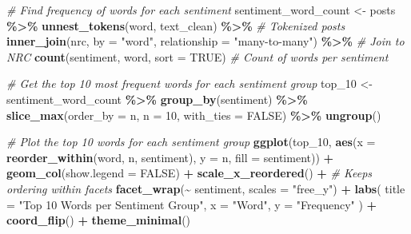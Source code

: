 \documentclass[
]{article}
\newenvironment{Shaded}{\begin{snugshade}}{\end{snugshade}}
\newcommand{\AttributeTok}[1]{\textcolor[rgb]{0.13,0.29,0.53}{#1}}
\newcommand{\CommentTok}[1]{\textcolor[rgb]{0.56,0.35,0.01}{\textit{#1}}}
\newcommand{\ConstantTok}[1]{\textcolor[rgb]{0.56,0.35,0.01}{#1}}
\newcommand{\DecValTok}[1]{\textcolor[rgb]{0.00,0.00,0.81}{#1}}
\newcommand{\FunctionTok}[1]{\textcolor[rgb]{0.13,0.29,0.53}{\textbf{#1}}}
\newcommand{\NormalTok}[1]{#1}
\newcommand{\OtherTok}[1]{\textcolor[rgb]{0.56,0.35,0.01}{#1}}
\newcommand{\SpecialCharTok}[1]{\textcolor[rgb]{0.81,0.36,0.00}{\textbf{#1}}}
\newcommand{\StringTok}[1]{\textcolor[rgb]{0.31,0.60,0.02}{#1}}
\begin{document}
\begin{Shaded}
\begin{Highlighting}[]
\CommentTok{\# Find frequency of words for each sentiment }
\NormalTok{sentiment\_word\_count }\OtherTok{\textless{}{-}}\NormalTok{ posts }\SpecialCharTok{\%\textgreater{}\%} 
  \FunctionTok{unnest\_tokens}\NormalTok{(word, text\_clean) }\SpecialCharTok{\%\textgreater{}\%} \CommentTok{\# Tokenized posts}
  \FunctionTok{inner\_join}\NormalTok{(nrc, }\AttributeTok{by =} \StringTok{"word"}\NormalTok{, }\AttributeTok{relationship =} \StringTok{"many{-}to{-}many"}\NormalTok{) }\SpecialCharTok{\%\textgreater{}\%} \CommentTok{\# Join to NRC }
  \FunctionTok{count}\NormalTok{(sentiment, word, }\AttributeTok{sort =} \ConstantTok{TRUE}\NormalTok{)  }\CommentTok{\# Count of words per sentiment }

\CommentTok{\# Get the top 10 most frequent words for each sentiment group }
\NormalTok{top\_10 }\OtherTok{\textless{}{-}}\NormalTok{ sentiment\_word\_count }\SpecialCharTok{\%\textgreater{}\%} 
  \FunctionTok{group\_by}\NormalTok{(sentiment) }\SpecialCharTok{\%\textgreater{}\%} 
  \FunctionTok{slice\_max}\NormalTok{(}\AttributeTok{order\_by =}\NormalTok{ n, }\AttributeTok{n =} \DecValTok{10}\NormalTok{, }\AttributeTok{with\_ties =} \ConstantTok{FALSE}\NormalTok{) }\SpecialCharTok{\%\textgreater{}\%}
  \FunctionTok{ungroup}\NormalTok{()}

\CommentTok{\# Plot the top 10 words for each sentiment group }
\FunctionTok{ggplot}\NormalTok{(top\_10, }\FunctionTok{aes}\NormalTok{(}\AttributeTok{x =} \FunctionTok{reorder\_within}\NormalTok{(word, n, sentiment), }\AttributeTok{y =}\NormalTok{ n, }\AttributeTok{fill =}\NormalTok{ sentiment)) }\SpecialCharTok{+}
  \FunctionTok{geom\_col}\NormalTok{(}\AttributeTok{show.legend =} \ConstantTok{FALSE}\NormalTok{) }\SpecialCharTok{+}
  \FunctionTok{scale\_x\_reordered}\NormalTok{() }\SpecialCharTok{+}  \CommentTok{\# Keeps ordering within facets}
  \FunctionTok{facet\_wrap}\NormalTok{(}\SpecialCharTok{\textasciitilde{}}\NormalTok{ sentiment, }\AttributeTok{scales =} \StringTok{"free\_y"}\NormalTok{) }\SpecialCharTok{+}
  \FunctionTok{labs}\NormalTok{(}
    \AttributeTok{title =} \StringTok{"Top 10 Words per Sentiment Group"}\NormalTok{,}
    \AttributeTok{x =} \StringTok{"Word"}\NormalTok{,}
    \AttributeTok{y =} \StringTok{"Frequency"}
\NormalTok{  ) }\SpecialCharTok{+}
  \FunctionTok{coord\_flip}\NormalTok{() }\SpecialCharTok{+} 
  \FunctionTok{theme\_minimal}\NormalTok{()}
\end{Highlighting}
\end{Shaded}
\end{document}
